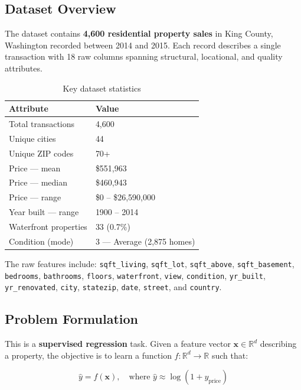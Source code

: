 \documentclass[12pt, a4paper]{article}
\begin{document}
\subsection{Dataset Overview}

The dataset contains \textbf{4,600 residential property sales} in King County,
Washington recorded between 2014 and 2015. Each record describes a single
transaction with 18 raw columns spanning structural, locational, and quality
attributes.

\begin{table}[H]
\centering
\caption{Key dataset statistics}
\begin{tabular}{ll}
  \toprule
  \textbf{Attribute}        & \textbf{Value} \\
  \midrule
  Total transactions        & 4,600 \\
  Unique cities             & 44 \\
  Unique ZIP codes          & 70+ \\
  Price --- mean            & \$551,963 \\
  Price --- median          & \$460,943 \\
  Price --- range           & \$0 -- \$26,590,000 \\
  Year built --- range      & 1900 -- 2014 \\
  Waterfront properties     & 33 (0.7\%) \\
  Condition (mode)          & 3 --- Average (2,875 homes) \\
  \bottomrule
\end{tabular}
\end{table}

The raw features include: \texttt{sqft\_living}, \texttt{sqft\_lot},
\texttt{sqft\_above}, \texttt{sqft\_basement}, \texttt{bedrooms},
\texttt{bathrooms}, \texttt{floors}, \texttt{waterfront}, \texttt{view},
\texttt{condition}, \texttt{yr\_built}, \texttt{yr\_renovated}, \texttt{city},
\texttt{statezip}, \texttt{date}, \texttt{street}, and \texttt{country}.

\subsection{Problem Formulation}

This is a \textbf{supervised regression} task. Given a feature vector
$\mathbf{x} \in \mathbb{R}^d$ describing a property, the objective is to learn a
function $f: \mathbb{R}^d \rightarrow \mathbb{R}$ such that:

\[
  \hat{y} = f(\mathbf{x}), \quad \text{where } \hat{y} \approx \log(1 + y_{\text{price}})
\]
\end{document}

